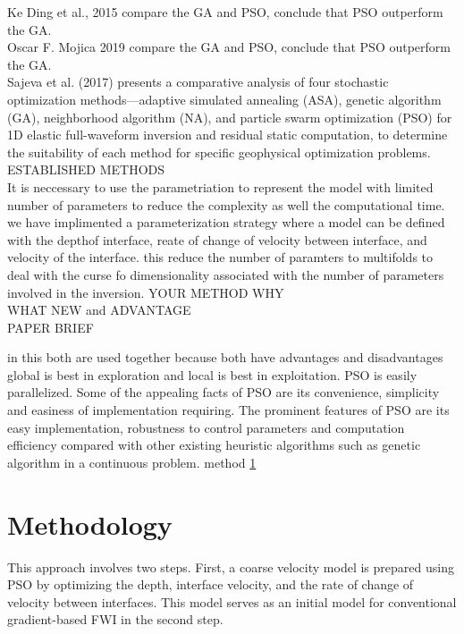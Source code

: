 \documentclass[paper,revised]{geophysics}
\begin{document}
Ke Ding et al., 2015  compare the GA and PSO, conclude that PSO outperform the GA.
\\
Oscar F. Mojica 2019 compare the GA and PSO, conclude that PSO outperform the GA.
\\
Sajeva et al. (2017) presents a comparative analysis of four stochastic optimization methods—adaptive simulated annealing (ASA), genetic algorithm (GA), neighborhood algorithm (NA), and particle swarm optimization (PSO) for 1D elastic full-waveform inversion and residual static computation, to determine the suitability of each method for specific geophysical optimization problems.
\\

ESTABLISHED METHODS
\\
It is neccessary to use the parametriation to represent the model with limited number of parameters to reduce the complexity as well the computational time. we have implimented a parameterization strategy where a model can be defined with the depthof interface, reate of change of velocity between interface, and velocity of the interface. this reduce the number of paramters to multifolds to deal with the curse fo dimensionality associated with the number of parameters involved in the inversion.
YOUR METHOD WHY
\\ 
WHAT NEW and ADVANTAGE
\\
PAPER BRIEF



 in this both are used together because both have advantages and disadvantages global is best in exploration and local is best in exploitation. PSO is easily parallelized.
Some of the appealing facts of PSO are its convenience, simplicity and easiness of implementation requiring.
The prominent features of PSO are its easy implementation, robustness to control parameters and computation efficiency compared with other existing heuristic algorithms such as genetic algorithm in a continuous problem.
method \ref{method}
\section{Methodology}
\label{method}
This approach involves two steps. First, a coarse velocity model is prepared using PSO by optimizing the depth, interface velocity, and the rate of change of velocity between interfaces. This model serves as an initial model for conventional gradient-based FWI in the second step.
\end{document}
